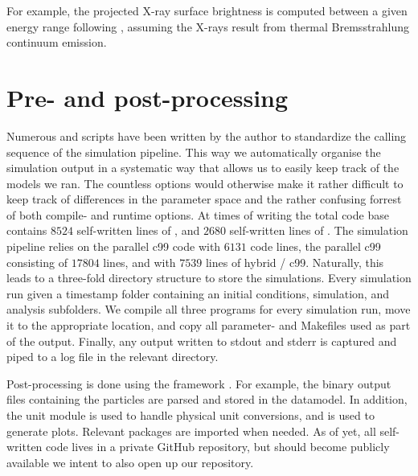 \documentclass[MScProj_TLRH_ClusterEnergy.tex]{subfiles}
\begin{document}
For example, the projected X-ray surface brightness is computed between a given
energy range following \citep[][eq. 3]{1996MNRAS.283..431B}, assuming the X-rays
result from thermal Bremsstrahlung continuum emission.

\section{Pre- and post-processing}
\label{sec:python}

Numerous  and  scripts have been written by the author
to standardize the calling sequence of the simulation pipeline. This way we
automatically organise the simulation output in a systematic way that allows us
to easily keep track of the models we ran. The countless options would otherwise 
make it rather difficult to keep track of differences in the parameter space
and the rather confusing forrest of both compile- and runtime options. At times
of writing the total code base contains $8524$ self-written lines of ,
and $2680$ self-written lines of . The simulation pipeline relies
on the  parallel c99 code  with $6131$ code lines,
the  parallel c99  consisting of $17804$ lines, and 
 with $7539$ lines of hybrid / c99. Naturally, 
this leads to a three-fold directory structure to store the simulations. 
Every simulation run given a timestamp folder containing an initial conditions, 
simulation, and analysis subfolders. We compile all three programs for every 
simulation run, move it to the appropriate location, and copy all parameter- and
Makefiles used as part of the output. Finally, any output written to stdout and 
stderr is captured and piped to a log file in the relevant directory.

Post-processing is done using the  framework
\citep{2009NewA...14..369P, 2013CoPhC.183..456P, 2013A&A...557A..84P}. For example,
the binary  output files containing the particles are parsed and stored 
in the  datamodel. In addition, the  unit module is used 
to handle physical unit conversions, and  is used to generate 
plots. Relevant  packages are imported when needed. As of yet, all
self-written code lives in a private GitHub repository, but should  
become publicly available we intent to also open up our repository.

\SubfileBibliography
\end{document}
